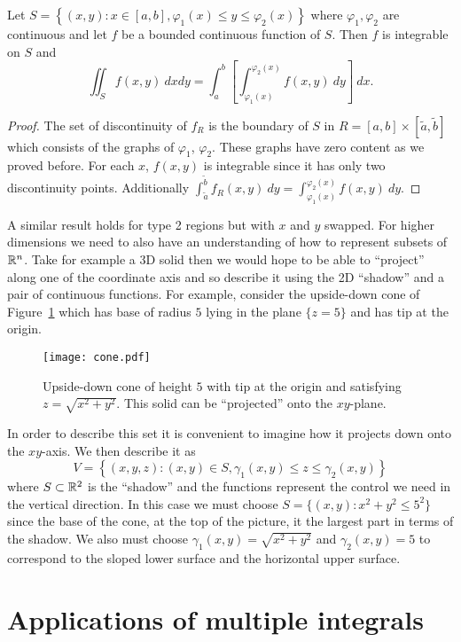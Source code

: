 \begin{theorem}
    Let \(S = \left\{(x,y): x \in [a,b], \varphi_1(x) \leq y \leq \varphi_2(x)\right\}\) where \(\varphi_1, \varphi_2\) are continuous and let \(f\) be a bounded continuous function of \(S\).
    Then \(f\) is integrable on \(S\) and
    \[
        \iint_{S} f(x,y) \ dx dy = \int_{a}^{b} \left[\int_{\varphi_1(x)}^{\varphi_2(x)} f(x,y) \ dy\right] \ dx.
    \]
\end{theorem}
%
\begin{proof}
    The set of discontinuity of \(f_{R}\) is the boundary of \(S\) in \(R=[a,b]\times[\tilde a,\tilde b]\) which consists of the graphs of \(\varphi_1\), \(\varphi_2\).
    These graphs have zero content as we proved before.
    For each \(x\), \(f(x,y)\) is integrable since it has only two discontinuity points.
    Additionally \(\int_{\tilde a}^{\tilde b} f_{R}(x,y) \ dy =  \int_{\varphi_1(x)}^{\varphi_2(x)} f(x,y) \ dy \).
\end{proof}
%
A similar result holds for type 2 regions but with \(x\) and \(y\) swapped.
For higher dimensions we need to also have an understanding of how to represent subsets of \(\mathbb{R}^n\).
Take for example a 3D solid then we would hope to be able to ``project'' along one of the coordinate axis and so describe it using the 2D ``shadow'' and a pair of continuous functions.
For example, consider the upside-down cone of Figure~\ref{fig:cone} which has base of radius \(5\) lying in the plane \(\{z=5\}\) and has tip at the origin.
%
\begin{figure}
    \centering
    \texttt{[image: cone.pdf]}
    \caption{Upside-down cone of height \(5\) with tip at the origin and satisfying \(z = \sqrt{x^2+y^2}\). This solid can be ``projected'' onto the \(xy\)-plane.}%
    \label{fig:cone}
\end{figure}
%
In order to describe this set it is convenient to imagine how it projects down onto the \(xy\)-axis. 
We then describe it as
\[
    V = \left\{(x,y,z) : (x,y) \in S, \gamma_1(x,y)\leq z \leq \gamma_2(x,y) \right\}
\]
where \(S \subset \mathbb{R}^2\) is the ``shadow'' and the functions represent the control we need in the vertical direction.
In this case we must choose \(S = \{(x,y): x^2 + y^2 \leq 5^2\}\)since the base of the cone, at the top of the picture, it the largest part in terms of the shadow.
We also must choose \(\gamma_1(x,y) = \sqrt{x^2 + y^2}\) and \(\gamma_2(x,y) = 5\) to correspond to the sloped lower surface and the horizontal upper surface.

\section{Applications of multiple integrals}

